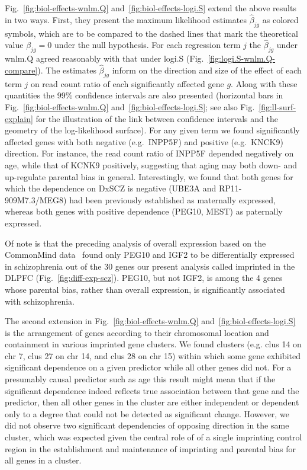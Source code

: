 \documentclass[letterpaper]{article}
\begin{document}
Fig.~\ref{fig:biol-effects-wnlm.Q} and~\ref{fig:biol-effects-logi.S} extend
the above results in two ways. First, they present the maximum likelihood
estimates \(\hat\beta_{jg}\) as colored symbols, which are to be compared to
the dashed lines that mark the theoretical value \(\beta_{jg} = 0\) under
the null hypothesis.  For each regression term \(j\) the \(\hat\beta_{jg}\)
under wnlm.Q agreed reasonably with that under logi.S
(Fig.~\ref{fig:logi.S-wnlm.Q-compare}).  The estimates \(\hat\beta_{jg}\)
inform on the direction and size of the effect of each term \(j\) on read
count ratio of each significantly affected gene \(g\).  Along with these
quantities the 99\% confidence intervals are also presented (horizontal bars
in Fig.~\ref{fig:biol-effects-wnlm.Q} and~\ref{fig:biol-effects-logi.S}; see
also Fig.~\ref{fig:ll-surf-explain} for the illustration of the link between
confidence intervals and the geometry of the log-likelihood surface). For any
given term we found significantly affected genes with both negative
(e.g.~INPP5F) and positive (e.g.~KNCK9) direction.  For instance, the read
count ratio of INPP5F depended negatively on age, while that of KCNK9
positively, suggesting that aging may both down- and up-regulate parental
bias in general. Interestingly, we found that both genes for which the dependence on
DxSCZ is negative (UBE3A and RP11-909M7.3/MEG8) had been previously
established as maternally expressed, whereas both genes with positive
dependence (PEG10, MEST) as paternally expressed.

Of note is that the preceding analysis of overall expression based on the
CommonMind data~\cite{Fromer2016a} found only PEG10 and IGF2 to be
differentially expressed in schizophrenia out of the 30 genes our present
analysis called imprinted in the DLPFC (Fig.~\ref{fig:diff-exp-scz}). PEG10,
but not IGF2, is among the 4 genes whose parental bias, rather than overall
expression, is significantly associated with schizophrenia.

The second extension in Fig.~\ref{fig:biol-effects-wnlm.Q}
and~\ref{fig:biol-effects-logi.S} is the arrangement of genes according to
their chromosomal location and containment in various imprinted gene clusters.
We found clusters (e.g. clus 14 on chr 7, clus 27 on chr 14, and clus 28 on
chr 15) within which some gene exhibited significant dependence on a given
predictor while all other genes did not. For a presumably causal predictor such
as age this result might mean that if the significant dependence indeed
reflects true association between that gene and the predictor, then all other
genes in the cluster are either independent or dependent only to a degree that
could not be detected as significant change. However, we did not observe two
significant dependencies of opposing direction in the same cluster, which was
expected given the central role of of a single imprinting control region in
the establishment and maintenance of imprinting and parental bias for all
genes in a cluster.
\end{document}
